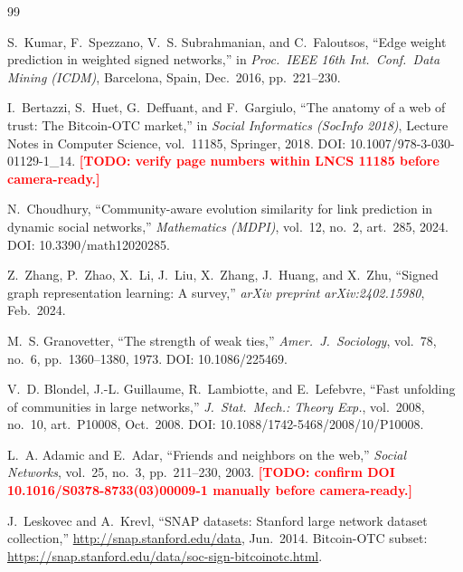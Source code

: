 \documentclass[conference]{IEEEtran}
\newcommand{\todo}[1]{\textcolor{red}{\textbf{[TODO: #1]}}}
\begin{document}
\begin{thebibliography}{99}

S.~Kumar, F.~Spezzano, V.~S. Subrahmanian, and C.~Faloutsos,
``Edge weight prediction in weighted signed networks,''
in \emph{Proc.\ IEEE 16th Int.\ Conf.\ Data Mining (ICDM)},
Barcelona, Spain, Dec.\ 2016, pp.\ 221--230.

I.~Bertazzi, S.~Huet, G.~Deffuant, and F.~Gargiulo,
``The anatomy of a web of trust: The Bitcoin-OTC market,''
in \emph{Social Informatics (SocInfo 2018)},
Lecture Notes in Computer Science, vol.\ 11185, Springer, 2018.
DOI: 10.1007/978-3-030-01129-1\_14.
\todo{verify page numbers within LNCS 11185 before camera-ready.}

N.~Choudhury,
``Community-aware evolution similarity for link prediction in dynamic
social networks,''
\emph{Mathematics (MDPI)}, vol.\ 12, no.\ 2, art.\ 285, 2024.
DOI: 10.3390/math12020285.

Z.~Zhang, P.~Zhao, X.~Li, J.~Liu, X.~Zhang, J.~Huang, and X.~Zhu,
``Signed graph representation learning: A survey,''
\emph{arXiv preprint arXiv:2402.15980}, Feb.\ 2024.

M.~S. Granovetter,
``The strength of weak ties,''
\emph{Amer.\ J.\ Sociology}, vol.\ 78, no.\ 6, pp.\ 1360--1380, 1973.
DOI: 10.1086/225469.

V.~D. Blondel, J.-L. Guillaume, R.~Lambiotte, and E.~Lefebvre,
``Fast unfolding of communities in large networks,''
\emph{J.\ Stat.\ Mech.: Theory Exp.}, vol.\ 2008, no.\ 10, art.\ P10008,
Oct.\ 2008. DOI: 10.1088/1742-5468/2008/10/P10008.

L.~A. Adamic and E.~Adar,
``Friends and neighbors on the web,''
\emph{Social Networks}, vol.\ 25, no.\ 3, pp.\ 211--230, 2003.
\todo{confirm DOI 10.1016/S0378-8733(03)00009-1 manually before
camera-ready.}

J.~Leskovec and A.~Krevl,
``SNAP datasets: Stanford large network dataset collection,''
\url{http://snap.stanford.edu/data}, Jun.\ 2014.
Bitcoin-OTC subset:
\url{https://snap.stanford.edu/data/soc-sign-bitcoinotc.html}.

\end{thebibliography}
\end{document}
